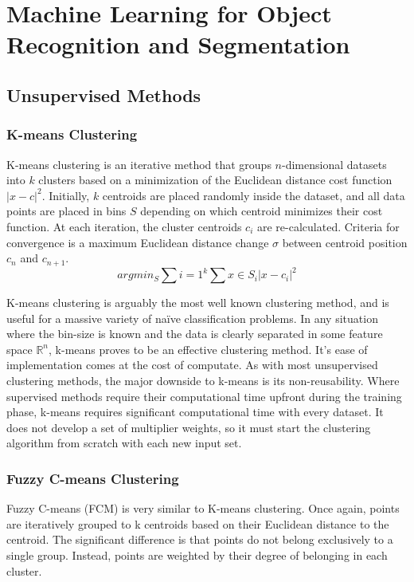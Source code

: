 \documentclass[12pt]{drexelthesis}
\let\Oldsection\section
\renewcommand{\section}{\FloatBarrier\Oldsection}
\let\Oldsubsection\subsection
\renewcommand{\subsection}{\FloatBarrier\Oldsubsection}
\let\Oldsubsubsection\subsubsection
\renewcommand{\subsubsection}{\FloatBarrier\Oldsubsubsection}
\begin{document}
 


\section{Machine Learning for Object Recognition and Segmentation}
\label{sec:machinelearning}

\subsection{Unsupervised Methods}

\subsubsection{K-means Clustering}
K-means clustering is an iterative method that groups $n$-dimensional datasets into $k$ clusters based on a minimization of the Euclidean distance cost function $|x-c|^{2}$. Initially, $k$ centroids are placed randomly inside the dataset, and all data points are placed in bins $S$ depending on which centroid minimizes their cost function. At each iteration, the cluster centroids $c_{i}$ are re-calculated. Criteria for convergence is a maximum Euclidean distance change $\sigma$ between centroid position $c_{n}$ and $c_{n+1}$.
\begin{equation}
	arg min_{S} \sum{i=1}^{k} \sum{x \in S_{i}} |x - c_{i}|^{2}
\end{equation}

K-means clustering is arguably the most well known clustering method, and is useful for a massive variety of naïve classification problems. In any situation where the bin-size is known and the data is clearly separated in some feature space $\mathbb{R}^{n}$, k-means proves to be an effective clustering method. It's ease of implementation comes at the cost of computate. As with most unsupervised clustering methods, the major downside to k-means is its non-reusability. Where supervised methods require their computational time upfront during the training phase, k-means requires significant computational time with every dataset. It does not develop a set of multiplier weights, so it must start the clustering algorithm from scratch with each new input set.

\subsubsection{Fuzzy C-means Clustering}

Fuzzy C-means (FCM) is very similar to K-means clustering. Once again, points are iteratively grouped to k centroids based on their Euclidean distance to the centroid. The significant difference is that points do not belong exclusively to a single group. Instead, points are weighted by their degree of belonging in each cluster.
\end{document}
